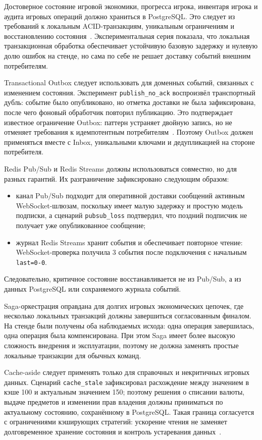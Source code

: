 \documentclass[a4paper,14pt]{extarticle}
\numberwithin{figure}{section}
\numberwithin{table}{section}
\begin{document}
Достоверное состояние игровой экономики, прогресса игрока, инвентаря игрока и аудита игровых операций должно храниться в PostgreSQL. Это следует из требований к локальным ACID-транзакциям, уникальным ограничениям и восстановлению состояния~\cite{postgres2026ha,postgres2026partitioning}. Экспериментальная серия показала, что локальная транзакционная обработка обеспечивает устойчивую базовую задержку и нулевую долю ошибок на стенде, но сама по себе не решает доставку событий внешним потребителям.

Transactional Outbox следует использовать для доменных событий, связанных с изменением состояния. Эксперимент \texttt{publish\_no\_ack} воспроизвёл транспортный дубль: событие было опубликовано, но отметка доставки не была зафиксирована, после чего фоновый обработчик повторил публикацию. Это подтверждает известное ограничение Outbox: паттерн устраняет двойную запись, но не отменяет требования к идемпотентным потребителям~\cite{dudycz2020outbox,eipIdempotentReceiver}. Поэтому Outbox должен применяться вместе с Inbox, уникальными ключами и дедупликацией на стороне потребителя.

Redis Pub/Sub и Redis Streams должны использоваться совместно, но для разных гарантий. Их разграничение зафиксировано следующим образом:
\begin{itemize}
\item канал Pub/Sub подходит для оперативной доставки сообщений активным WebSocket-шлюзам, поскольку имеет малую задержку и простую модель подписки, а сценарий \texttt{pubsub\_loss} подтвердил, что поздний подписчик не получает уже опубликованное сообщение;
\item журнал Redis Streams хранит события и обеспечивает повторное чтение: WebSocket-проверка получила 3 события после подключения с начальным \texttt{last=0-0}.
\end{itemize}
Следовательно, критичное состояние восстанавливается не из Pub/Sub, а из данных PostgreSQL или сохраняемого журнала событий.

Saga-оркестрация оправдана для долгих игровых экономических цепочек, где несколько локальных транзакций должны завершиться согласованным финалом. На стенде были получены оба наблюдаемых исхода: одна операция завершилась, одна операция была компенсирована. При этом Saga имеет более высокую сложность внедрения и эксплуатации, поэтому не должна заменять простые локальные транзакции для обычных команд.

Cache-aside следует применять только для справочных и некритичных игровых данных. Сценарий \texttt{cache\_stale} зафиксировал расхождение между значением в кэше 100 и актуальным значением 150; поэтому решения о списании валюты, выдаче предметов и изменении прав владения должны приниматься по актуальному состоянию, сохранённому в PostgreSQL. Такая граница согласуется с ограничениями кэширующих стратегий: ускорение чтения не заменяет долговременное хранение состояния и контроль устаревания данных~\cite{tessier2025caching}.
\end{document}
